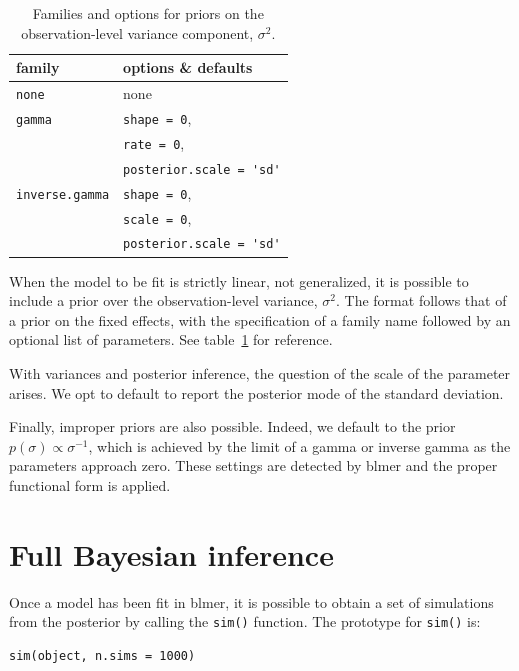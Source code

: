 \documentclass[10pt]{article}
\newcommand{\pkg}[1]{{\fontseries{b}\selectfont #1}}
\newcommand{\code}[1]{\texttt{#1}}
\begin{document}
\begin{table}
\begin{center}{\small
\begin{tabular}{ll}
family & options \& defaults \\ \hline
\code{none} & none \\
\code{gamma} & \code{shape = 0}, \\
 & \code{rate = 0}, \\
 & \code{posterior.scale = }\verb/'sd'/ \\
\code{inverse.gamma} & \code{shape = 0}, \\
& \code{scale = 0}, \\
& \code{posterior.scale = }\verb/'sd'/ \\
\end{tabular}}
\end{center}
\caption{Families and options for priors on the observation-level
  variance component, $\sigma^2$.}
\label{tab:observation_variance_prior_options}
\end{table}

When the model to be fit is strictly linear, not generalized, it is possible to include a prior over the observation-level variance,
$\sigma^2$. The format follows that of a prior on the fixed effects,
with the specification of a family name followed by an optional list
of parameters. See table~\ref{tab:observation_variance_prior_options}
for reference.

With variances and posterior inference, the question of the scale of
the parameter arises. We opt to default to report the posterior mode
of the standard deviation.

Finally, improper priors are also possible. Indeed, we default to the
prior $p(\sigma) \propto \sigma^{-1}$, which is achieved by the limit
of a gamma or inverse gamma as the parameters approach zero. These
settings are detected by \pkg{blmer} and the proper functional form is applied.

\section{Full Bayesian inference}

Once a model has been fit in \pkg{blmer}, it is possible to
obtain a set of simulations from the posterior by calling the
\code{sim()} function. The prototype for \code{sim()} is:

\begin{verbatim}
sim(object, n.sims = 1000)
\end{verbatim}
\end{document}
